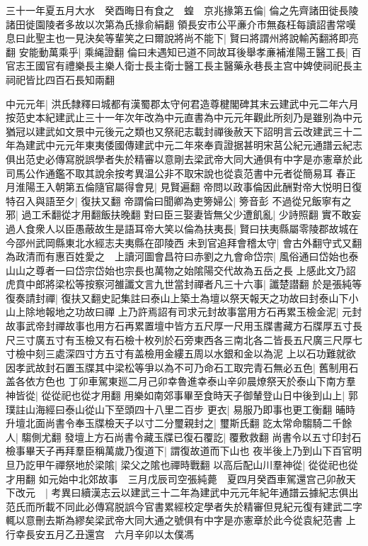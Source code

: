 三十一年夏五月大水　癸酉晦日有食之　蝗　京兆掾第五倫|{
	倫之先齊諸田徙長陵諸田徙園陵者多故以次第為氏掾俞絹翻}
領長安市公平亷介市無姦枉每讀詔書常嘆息曰此聖主也一見決矣等輩笑之曰爾說將尚不能下|{
	賢曰將謂州將說輸芮翻將即亮翻}
安能動萬乘乎|{
	乘䋲證翻}
倫曰未遇知已道不同故耳後舉孝亷補淮陽王醫工長|{
	百官志王國官有禮樂長主樂人衛士長主衛士醫工長主醫藥永巷長主宫中婢使祠祀長主祠祀皆比四百石長知兩翻}


中元元年|{
	洪氏隸釋曰城都有漢蜀郡太守何君造尊楗閣碑其末云建武中元二年六月按范史本紀建武止三十一年次年改為中元直書為中元元年觀此所刻乃是雖别為中元猶冠以建武如文景中元後元之類也又祭祀志載封禪後赦天下詔明言云改建武三十二年為建武中元元年東夷倭國傳建武中元二年來奉貢證据甚明宋莒公紀元通譜云紀志俱出范史必傳寫脱誤學者失於精審以意剛去梁武帝大同大通俱有中字是亦憲章於此司馬公作通鑑不取其說余按考異温公非不取宋說也從袁范書中元者從簡易耳}
春正月淮陽王入朝第五倫隨官屬得會見|{
	見賢遍翻}
帝問以政事倫因此酬對帝大悦明日復特召入與語至夕|{
	復扶又翻}
帝謂倫曰聞卿為吏篣婦公|{
	篣音彭}
不過從兄飯寧有之邪|{
	過工禾翻從才用翻飯扶晚翻}
對曰臣三娶妻皆無父少遭飢亂|{
	少詩照翻}
實不敢妄過人食衆人以臣愚蔽故生是語耳帝大笑以倫為扶夷長|{
	賢曰扶夷縣屬零陵郡故城在今邵州武岡縣東北水經志夫夷縣在卲陵西}
未到官追拜會稽太守|{
	會古外翻守式又翻}
為政清而有惠百姓愛之　上讀河圖會昌符曰赤劉之九會命岱宗|{
	風俗通曰岱始也泰山山之尊者一曰岱宗岱始也宗長也萬物之始隂陽交代故為五岳之長}
上感此文乃詔虎賁中郎將梁松等按察河雒讖文言九世當封禪者凡三十六事|{
	讖楚譛翻}
於是張純等復奏請封禪|{
	復扶又翻史記集註曰泰山上築土為壇以祭天報天之功故曰封泰山下小山上除地報地之功故曰禪}
上乃許焉詔有司求元封故事當用方石再累玉檢金泥|{
	元封故事武帝封禪故事也用方石再累置壇中皆方五尺厚一尺用玉牒書藏方石牒厚五寸長尺三寸廣五寸有玉檢又有石檢十枚列於石旁東西各三南北各二皆長五尺廣三尺厚七寸檢中刻三處深四寸方五寸有盖檢用金縷五周以水銀和金以為泥}
上以石功難就欲因孝武故封石置玉牒其中梁松等爭以為不可乃命石工取完青石無必五色|{
	舊制用石盖各依方色也}
丁卯車駕東廵二月己卯幸魯進幸泰山辛卯晨燎祭天於泰山下南方羣神皆從|{
	從從祀也從才用翻}
用樂如南郊事畢至食時天子御輦登山日中後到山上|{
	郭璞註山海經曰泰山從山下至頭四十八里二百步}
更衣|{
	易服乃即事也更工衡翻}
晡時升壇北面尚書令奉玉牒檢天子以寸二分璽親封之|{
	璽斯氏翻}
訖太常命騶騎二千餘人|{
	騶側尤翻}
發壇上方石尚書令藏玉牒已復石覆訖|{
	覆敷救翻}
尚書令以五寸印封石檢事畢天子再拜羣臣稱萬歲乃復道下|{
	謂復故道而下山也}
夜半後上乃到山下百官明旦乃訖甲午禪祭地於梁隂|{
	梁父之隂也禪時戰翻}
以高后配山川羣神從|{
	從從祀也從才用翻}
如元始中北郊故事　三月戊辰司空張純薨　夏四月癸酉車駕還宫己卯赦天下改元　|{
	考異曰續漢志云以建武三十二年為建武中元元年紀年通譜云據紀志俱出范氏而所載不同此必傳寫脱誤今官書累經校定學者失於精審但見紀元復有建武二字輒以意刪去斯為繆矣梁武帝大同大通之號俱有中字是亦憲章於此今從袁紀范書}
上行幸長安五月乙丑還宫　六月辛卯以太僕馮

